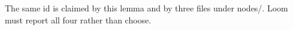 \begin{lemma}\label{hx-0007}
The same id is claimed by this lemma and by three files under nodes/. Loom must report all four rather than choose.
\end{lemma}